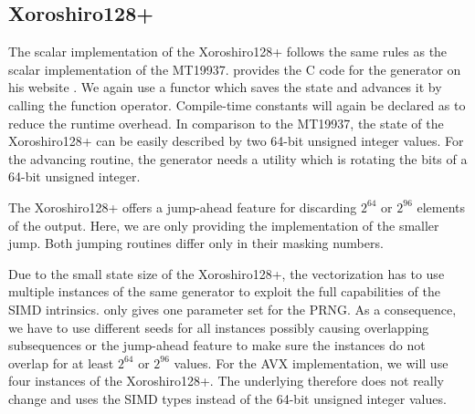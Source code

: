 \documentclass{stdlocal}
\begin{document}
  \subsection{Xoroshiro128+} %
  \label{sub:xoroshiro}
    The scalar implementation of the Xoroshiro128+ follows the same rules as the scalar implementation of the MT19937.
    \citeauthor{vigna-xoroshiro} provides the C code for the generator on his website \autocite{vigna-xoroshiro}.
    We again use a functor which saves the state and advances it by calling the function operator.
    Compile-time constants will again be declared as  to reduce the runtime overhead.
    In comparison to the MT19937, the state of the Xoroshiro128+ can be easily described by two 64-bit unsigned integer values.
    For the advancing routine, the generator needs a utility which is rotating the bits of a 64-bit unsigned integer.

    The Xoroshiro128+ offers a jump-ahead feature for discarding $2^{64}$ or $2^{96}$ elements of the output.
    Here, we are only providing the implementation of the smaller jump.
    Both jumping routines differ only in their masking numbers.


    Due to the small state size of the Xoroshiro128+, the vectorization has to use multiple instances of the same generator to exploit the full capabilities of the SIMD intrinsics.
    \citeauthor{vigna-xoroshiro} only gives one parameter set for the PRNG.
    As a consequence, we have to use different seeds for all instances possibly causing overlapping subsequences or the jump-ahead feature to make sure the instances do not overlap for at least $2^{64}$ or $2^{96}$ values.
    For the AVX implementation, we will use four instances of the Xoroshiro128+.
    The underlying therefore does not really change and uses the SIMD types instead of the 64-bit unsigned integer values.

\end{document}
